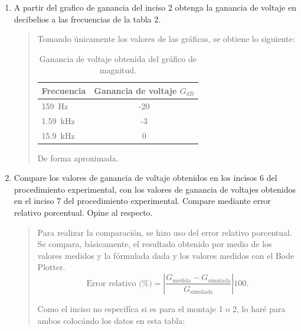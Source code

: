 \documentclass[12pt,a4paper]{article}
\begin{document}
\begin{enumerate}
\item A partir del grafico de ganancia del inciso 2 obtenga la ganancia de voltaje en decibelios a las frecuencias de la tabla 2.
\begin{quote}

    Tomando únicamente los valores de las gráficas, se obtiene lo siguiente:

    \begin{table}[H]
        \centering
        \caption{Ganancia de voltaje obtenida del gráfico de magnitud.}\label{tab:ganancia_grafica_rl}
        \begin{tabular}{@{}lc@{}}
            \toprule
            Frecuencia & Ganancia de voltaje \(G_{dB}\) \\
            \midrule
            \SI{159}{\hertz} & -20\\
            \SI{1.59}{\kilo\hertz} & -3\\
            \SI{15.9}{\kilo\hertz} & 0\\
            \bottomrule
        \end{tabular}
    \end{table}

    De forma aproximada.

\end{quote}

\item Compare los valores de ganancia de voltaje obtenidos en los incisos 6 del procedimiento experimental, con los valores de ganancia de voltajes obtenidos en el inciso 7 del procedimiento experimental. Compare mediante error relativo porcentual. Opine al respecto.
\begin{quote}
    Para realizar la comparación, se hizo uso del error relativo porcentual. Se compara, básicamente, el resultado obtenido por medio de los valores medidos y la fórmulada dada y los valores medidos con el Bode Plotter.
    \begin{equation}
        \text{Error relativo (\%)}=\left|\frac{G_{\mathrm{medida}}-G_{\mathrm{simulada}}}{G_{\mathrm{simulada}}}\right|100.
        \label{eq:error}
    \end{equation}

    Como el inciso no especifíca si es para el montaje 1 o 2, lo haré para ambos colocándo los datos en esta tabla:


\end{quote}
\end{enumerate}
\end{document}
